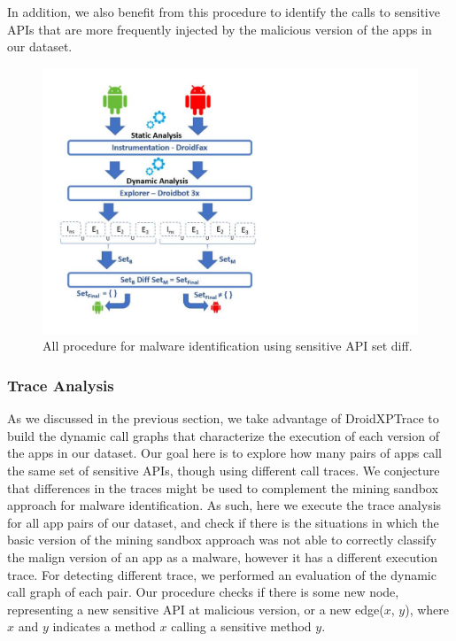 In addition, we also benefit from this procedure to identify the calls to sensitive APIs that are more frequently injected by the malicious version of the apps
in our dataset. 


\begin{figure}[ht]
\centering
\includegraphics[scale=0.4]{images/sensitiveAPIdiff.pdf}
\caption{All procedure for malware identification using sensitive API set diff.}
 \label{fig:sensitiveAPI}
\end{figure}




\subsubsection{Trace Analysis} \label{sec:pathsetup}


As we discussed in the previous section, we take advantage of DroidXPTrace to build the dynamic call graphs that characterize the execution of each version of the apps in our dataset. Our goal
here is to explore how many pairs of apps call the same set of sensitive APIs, though using different call
traces. We conjecture that differences in the traces might be used to complement the mining sandbox
approach for malware identification. As such, here we execute the trace
analysis for all app pairs of our dataset, and check if there is the situations in which the basic version of the mining sandbox approach was not able to correctly classify the malign version of an app as a malware, however it has a different execution trace. For detecting different trace, we performed an evaluation of the dynamic call graph of each pair. Our procedure checks if there is some new node, representing a new sensitive API at malicious version, or a new edge($x$, $y$), where $x$ and $y$ indicates a method $x$ calling a sensitive method $y$.

